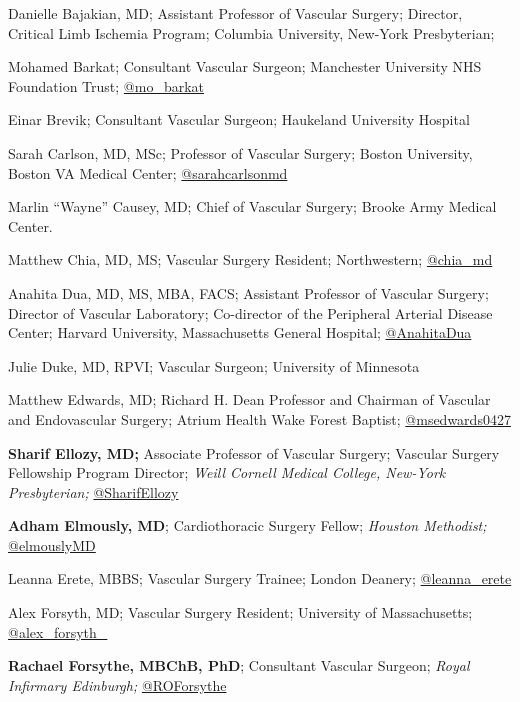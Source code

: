 \documentclass[
]{book}
\begin{document}
Danielle Bajakian, MD; Assistant Professor of Vascular Surgery; Director, Critical Limb Ischemia Program; Columbia University, New-York Presbyterian;

Mohamed Barkat; Consultant Vascular Surgeon; Manchester University NHS Foundation Trust; \href{https://twitter.com/mo_barkat}{@mo\_barkat}

Einar Brevik; Consultant Vascular Surgeon; Haukeland University Hospital

Sarah Carlson, MD, MSc; Professor of Vascular Surgery; Boston University, Boston VA Medical Center; \href{https://twitter.com/sarahcarlsonmd?lang=en}{@sarahcarlsonmd}

Marlin ``Wayne'' Causey, MD; Chief of Vascular Surgery; Brooke Army Medical Center.

Matthew Chia, MD, MS; Vascular Surgery Resident; Northwestern; \href{https://twitter.com/chia_md?lang=en}{@chia\_md}

Anahita Dua, MD, MS, MBA, FACS; Assistant Professor of Vascular Surgery; Director of Vascular Laboratory; Co-director of the Peripheral Arterial Disease Center; Harvard University, Massachusetts General Hospital; \href{https://twitter.com/anahitadua}{@AnahitaDua}

Julie Duke, MD, RPVI; Vascular Surgeon; University of Minnesota

Matthew Edwards, MD; Richard H. Dean Professor and Chairman of Vascular and Endovascular Surgery; Atrium Health Wake Forest Baptist; \href{https://mobile.twitter.com/msedwards0427}{@msedwards0427}

\textbf{Sharif Ellozy, MD;} Associate Professor of Vascular Surgery; Vascular Surgery Fellowship Program Director; \emph{Weill Cornell Medical College, New-York Presbyterian;} \href{https://twitter.com/sharifellozy}{@SharifEllozy}

\textbf{Adham Elmously, MD}; Cardiothoracic Surgery Fellow; \emph{Houston Methodist;} \href{https://twitter.com/elmouslymd?lang=en}{@elmouslyMD}

Leanna Erete, MBBS; Vascular Surgery Trainee; London Deanery; \href{https://twitter.com/leanna_erete?lang=en}{@leanna\_erete}

Alex Forsyth, MD; Vascular Surgery Resident; University of Massachusetts; \href{https://twitter.com/alex_forsyth_}{@alex\_forsyth\_}

\textbf{Rachael Forsythe, MBChB, PhD}; Consultant Vascular Surgeon; \emph{Royal Infirmary Edinburgh;} \href{https://twitter.com/roforsythe?lang=en}{@ROForsythe}
\end{document}
